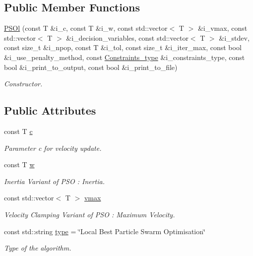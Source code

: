 \subsection*{Public Member Functions}
\begin{DoxyCompactItemize}
\item 
\hyperlink{structea_1_1_p_s_ol_ab0374356be7c06c8aae9092970f3525e}{P\+S\+Ol} (const T \&i\+\_\+c, const T \&i\+\_\+w, const std\+::vector$<$ T $>$ \&i\+\_\+vmax, const std\+::vector$<$ T $>$ \&i\+\_\+decision\+\_\+variables, const std\+::vector$<$ T $>$ \&i\+\_\+stdev, const size\+\_\+t \&i\+\_\+npop, const T \&i\+\_\+tol, const size\+\_\+t \&i\+\_\+iter\+\_\+max, const bool \&i\+\_\+use\+\_\+penalty\+\_\+method, const \hyperlink{namespaceutilities_ab1a1517bf6e62a1acfab5293ca8985c1}{Constraints\+\_\+type} \&i\+\_\+constraints\+\_\+type, const bool \&i\+\_\+print\+\_\+to\+\_\+output, const bool \&i\+\_\+print\+\_\+to\+\_\+file)
\begin{DoxyCompactList}\small\item\em Constructor. \end{DoxyCompactList}\end{DoxyCompactItemize}
\subsection*{Public Attributes}
\begin{DoxyCompactItemize}
\item 
const T \hyperlink{structea_1_1_p_s_ol_a7be4dc6b98fb6b991a69ad1c2275fffa}{c}
\begin{DoxyCompactList}\small\item\em Parameter c for velocity update. \end{DoxyCompactList}\item 
const T \hyperlink{structea_1_1_p_s_ol_a0c4742b6ff551a0c616fc64e093e6611}{w}
\begin{DoxyCompactList}\small\item\em Inertia Variant of P\+SO \+: Inertia. \end{DoxyCompactList}\item 
const std\+::vector$<$ T $>$ \hyperlink{structea_1_1_p_s_ol_a426318723c134f47004407c3f3ab79ce}{vmax}
\begin{DoxyCompactList}\small\item\em Velocity Clamping Variant of P\+SO \+: Maximum Velocity. \end{DoxyCompactList}\item 
const std\+::string \hyperlink{structea_1_1_p_s_ol_ad45c22065d096770d48b1c9e99dfd4fc}{type} = \char`\"{}Local Best Particle Swarm Optimisation\char`\"{}
\begin{DoxyCompactList}\small\item\em Type of the algorithm. \end{DoxyCompactList}\end{DoxyCompactItemize}
